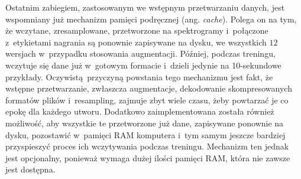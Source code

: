 Ostatnim zabiegiem, zastosowanym we wstępnym przetwarzaniu danych, jest wspomniany już mechanizm pamięci podręcznej (ang. \emph{cache}). Polega on na tym, że wczytane, zresamplowane, przetworzone na spektrogramy i~połączone z~etykietami nagrania są ponownie zapisywane na dysku, we wszystkich $12$ wersjach w~przypadku stosowania augmentacji. Później, podczas treningu, wczytuje się dane już w~gotowym formacie i~dzieli jedynie na 10-sekundowe przykłady. Oczywistą przyczyną powstania tego mechanizmu jest fakt, że wstępne przetwarzanie, zwłaszcza augmentacje, dekodowanie skompresowanych formatów plików i~resampling, zajmuje zbyt wiele czasu, żeby powtarzać je co epokę dla każdego utworu. Dodatkowo zaimplementowana została również możliwość, aby wszystkie te przetworzone już dane, zapisywane ponownie na dysku, pozostawić w~pamięci RAM komputera i~tym samym jeszcze bardziej przyspieszyć proces ich wczytywania podczas treningu. Mechanizm ten jednak jest opcjonalny, ponieważ wymaga dużej ilości pamięci RAM, która nie zawsze jest dostępna.
